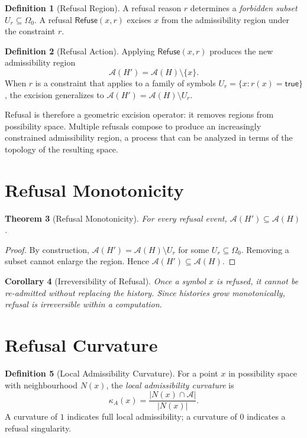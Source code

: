 \documentclass[12pt, a4paper, openany]{book}
\theoremstyle{plain}
\newtheorem{theorem}{Theorem}[chapter]
\newtheorem{corollary}[theorem]{Corollary}
\theoremstyle{definition}
\newtheorem{definition}[theorem]{Definition}
\theoremstyle{remark}
\newcommand{\Refuse}{\mathsf{Refuse}}
\newcommand{\calA}{\mathcal{A}}
\begin{document}
\begin{definition}[Refusal Region]
A refusal reason $r$ determines a \emph{forbidden subset} $U_r \subseteq \Omega_0$.
A refusal $\Refuse(x, r)$ excises $x$ from the admissibility region under
the constraint $r$.
\end{definition}

\begin{definition}[Refusal Action]
Applying $\Refuse(x, r)$ produces the new admissibility region
\[
\calA(H') = \calA(H) \setminus \{x\}.
\]
When $r$ is a constraint that applies to a family of symbols
$U_r = \{x : r(x) = \mathsf{true}\}$, the excision generalizes to
$\calA(H') = \calA(H) \setminus U_r$.
\end{definition}

Refusal is therefore a geometric excision operator: it removes regions from
possibility space. Multiple refusals compose to produce an increasingly constrained
admissibility region, a process that can be analyzed in terms of the topology of
the resulting space.

\section{Refusal Monotonicity}

\begin{theorem}[Refusal Monotonicity]
For every refusal event, $\calA(H') \subseteq \calA(H)$.
\end{theorem}

\begin{proof}
By construction, $\calA(H') = \calA(H) \setminus U_r$ for some $U_r \subseteq \Omega_0$.
Removing a subset cannot enlarge the region. Hence $\calA(H') \subseteq \calA(H)$.
\end{proof}

\begin{corollary}[Irreversibility of Refusal]
Once a symbol $x$ is refused, it cannot be re-admitted without replacing the
history. Since histories grow monotonically, refusal is irreversible within a
computation.
\end{corollary}

\section{Refusal Curvature}

\begin{definition}[Local Admissibility Curvature]
For a point $x$ in possibility space with neighbourhood $N(x)$,
the \emph{local admissibility curvature} is
\[
\kappa_A(x) = \frac{|N(x) \cap \calA|}{|N(x)|}.
\]
A curvature of $1$ indicates full local admissibility; a curvature of $0$
indicates a refusal singularity.
\end{definition}
\end{document}
